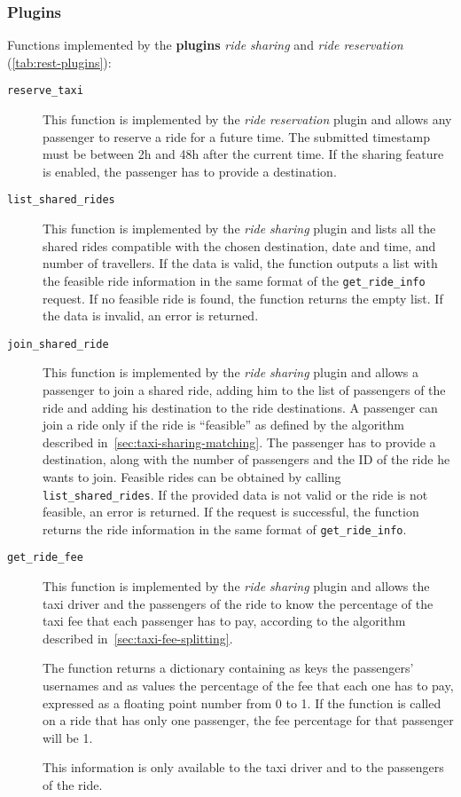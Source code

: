\subsubsection{Plugins}
Functions implemented by the \textbf{plugins} \emph{ride sharing} and \emph{ride reservation} (\autoref{tab:rest-plugins}):
\begin{description}
    \item[\texttt{reserve\_taxi}] This function is implemented by the \emph{ride reservation} plugin and allows any passenger to reserve a ride for a future time. The submitted timestamp must be between 2h and 48h after the current time. If the sharing feature is enabled, the passenger has to provide a destination.
    \item[\texttt{list\_shared\_rides}] This function is implemented by the \emph{ride sharing} plugin and lists all the shared rides compatible with the chosen destination, date and time, and number of travellers. If the data is valid, the function outputs a list with the feasible ride information in the same format of the \texttt{get\_ride\_info} request. If no feasible ride is found, the function returns the empty list. If the data is invalid, an error is returned.
    \item[\texttt{join\_shared\_ride}] This function is implemented by the \emph{ride sharing} plugin and allows a passenger to join a shared ride, adding him to the list of passengers of the ride and adding his destination to the ride destinations. A passenger can join a ride only if the ride is ``feasible'' as defined by the algorithm described in~\autoref{sec:taxi-sharing-matching}. The passenger has to provide a destination, along with the number of passengers and the ID of the ride he wants to join. Feasible rides can be obtained by calling \texttt{list\_shared\_rides}. If the provided data is not valid or the ride is not feasible, an error is returned. If the request is successful, the function returns the ride information in the same format of \texttt{get\_ride\_info}.

    \item[\texttt{get\_ride\_fee}] This function is implemented by the \emph{ride sharing} plugin and allows the taxi driver and the passengers of the ride to know the percentage of the taxi fee that each passenger has to pay, according to the algorithm described in~\autoref{sec:taxi-fee-splitting}.

    The function returns a dictionary containing as keys the passengers' usernames and as values the percentage of the fee that each one has to pay, expressed as a floating point number from 0 to 1. If the function is called on a ride that has only one passenger, the fee percentage for that passenger will be 1.

    This information is only available to the taxi driver and to the passengers of the ride.
\end{description}

